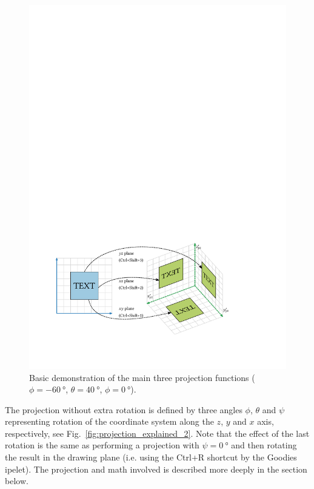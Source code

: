 \documentclass[11pt,a4paper]{article}
\begin{document}
\begin{figure}[bh]
\centering
\includegraphics[scale=1]{pdf/projection_explained_default_v3.pdf}
\caption{Basic demonstration of the main three projection functions ($\phi=\SI{-60}{\degree}$, $\theta=\SI{40}{\degree}$, $\phi=\SI{0}{\degree}$).}
\label{fig:easy_explained}
\end{figure}

The projection without extra rotation is defined by three angles $ \phi $, $ \theta $ and $ \psi $ representing rotation of the coordinate system along the $ z $, $ y $ and $ x $ axis, respectively, see Fig.~\ref{fig:projection_explained_2}. Note that the effect of the last rotation is the same as performing a projection with $ \psi=\SI{0}{\degree} $ and then rotating the result in the drawing plane (i.e. using the Ctrl+R shortcut by the Goodies ipelet). The projection and math involved is described more deeply in the section below.
\end{document}
